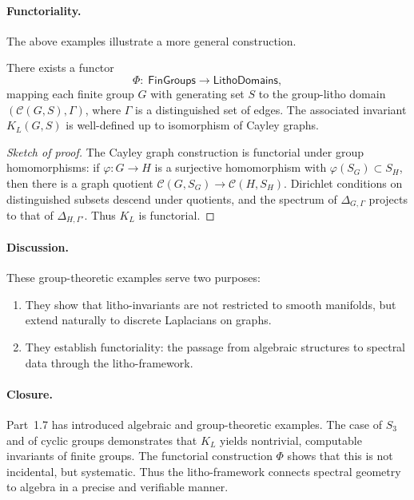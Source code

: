 \paragraph{Functoriality.}
The above examples illustrate a more general construction.

\begin{proposition}
There exists a functor
\[
\Phi:\; \mathsf{FinGroups} \to \mathsf{LithoDomains},
\]
mapping each finite group $G$ with generating set $S$
to the group-litho domain $(\mathcal{C}(G,S),\Gamma)$,
where $\Gamma$ is a distinguished set of edges.
The associated invariant $K_L(G,S)$ is well-defined up to isomorphism
of Cayley graphs.
\end{proposition}

\begin{proof}[Sketch of proof]
The Cayley graph construction is functorial under group homomorphisms:
if $\varphi:G\to H$ is a surjective homomorphism with $\varphi(S_G)\subset S_H$,
then there is a graph quotient $\mathcal{C}(G,S_G)\to \mathcal{C}(H,S_H)$.
Dirichlet conditions on distinguished subsets descend under quotients,
and the spectrum of $\Delta_{G,\Gamma}$ projects to that of $\Delta_{H,\Gamma'}$.
Thus $K_L$ is functorial.
\end{proof}

\paragraph{Discussion.}
These group-theoretic examples serve two purposes:

\begin{enumerate}
\item They show that litho-invariants are not restricted to smooth manifolds,
but extend naturally to discrete Laplacians on graphs.
\item They establish functoriality: the passage from algebraic structures
to spectral data through the litho-framework.
\end{enumerate}

\paragraph{Closure.}
Part~1.7 has introduced algebraic and group-theoretic examples.
The case of $S_3$ and of cyclic groups demonstrates that $K_L$ yields
nontrivial, computable invariants of finite groups.
The functorial construction $\Phi$ shows that this is not incidental,
but systematic. Thus the litho-framework connects spectral geometry
to algebra in a precise and verifiable manner.


